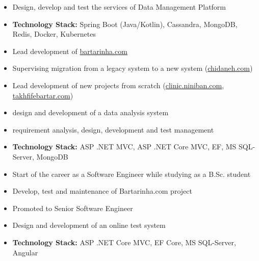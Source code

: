 \documentclass[10pt,a4paper,ragged2e,withhyper]{altacv}
\begin{document}
\begin{paracol}{2}

\begin{itemize}
\item Design, develop and test the services of Data Management Platform
\item \textbf{Technology Stack:} Spring Boot (Java/Kotlin), Cassandra, MongoDB, Redis, Docker, Kubernetes
\end{itemize}

\divider

\begin{itemize}
\item Lead development of \href{https://bartarinha.com}{bartarinha.com}
\item Supervising migration from a legacy system to a new system (\href{https://chidaneh.com}{chidaneh.com})
\item Lead development of new projects from scratch (\href{https://clinic.niniban.com}{clinic.niniban.com}, \href{https://takhfifebartar.com}{takhfifebartar.com})
\item design and development of a data analysis system
\item requirement analysis, design, development and test management
\item \textbf{Technology Stack:} ASP .NET MVC, ASP .NET Core MVC, EF, MS SQL-Server, MongoDB
\end{itemize}

\divider

\begin{itemize}
\item Start of the career as a Software Engineer while studying as a B.Sc. student
\item Develop, test and maintenance of Bartarinha.com project
\item Promoted to Senior Software Engineer
\end{itemize}


\begin{itemize}
\item Design and development of an online test system
\item\textbf{Technology Stack:} ASP .NET Core MVC, EF Core, MS SQL-Server, Angular
\end{itemize}


\end{paracol}
\end{document}
